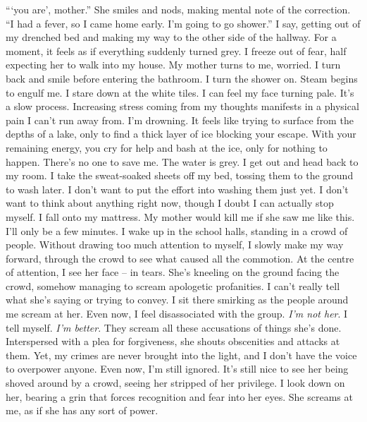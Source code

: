 \documentclass[a4paper, 12pt]{book}
\begin{document}
\begin{CJK*}{UTF8}{min}
\tab
```you are', mother.'' She smiles and nods, making mental note of the correction. ``I had a fever, so I came home early. I’m going to go shower.'' I say, getting out of my drenched bed and making my way to the other side of the hallway. For a moment, it feels as if everything suddenly turned grey. I freeze out of fear, half expecting her to walk into my house. My mother turns to me, worried. I turn back and smile before entering the bathroom.
\newline
\tab
I turn the shower on. Steam begins to engulf me. I stare down at the white tiles. I can feel my face turning pale. It’s a slow process. Increasing stress coming from my thoughts manifests in a physical pain I can’t run away from. I’m drowning. It feels like trying to surface from the depths of a lake, only to find a thick layer of ice blocking your escape. With your remaining energy, you cry for help and bash at the ice, only for nothing to happen. There’s no one to save me. The water is grey.
\newline
\tab
I get out and head back to my room. I take the sweat-soaked sheets off my bed, tossing them to the ground to wash later. I don’t want to put the effort into washing them just yet. I don’t want to think about anything right now, though I doubt I can actually stop myself. I fall onto my mattress. My mother would kill me if she saw me like this. I’ll only be a few minutes.
\newline
\tab
I wake up in the school halls, standing in a crowd of people. Without drawing too much attention to myself, I slowly make my way forward, through the crowd to see what caused all the commotion. At the centre of attention, I see her face -- in tears. She’s kneeling on the ground facing the crowd, somehow managing to scream apologetic profanities. I can’t really tell what she’s saying or trying to convey. I sit there smirking as the people around me scream at her. Even now, I feel disassociated with the group. \textit{I’m not her}. I tell myself. \textit{I’m better}. They scream all these accusations of things she’s done. Interspersed with a plea for forgiveness, she shouts obscenities and attacks at them. Yet, my crimes are never brought into the light, and I don’t have the voice to overpower anyone. Even now, I’m still ignored. It’s still nice to see her being shoved around by a crowd, seeing her stripped of her privilege. I look down on her, bearing a grin that forces recognition and fear into her eyes. She screams at me, as if she has any sort of power.
\newline

\end{CJK*}
\end{document}
